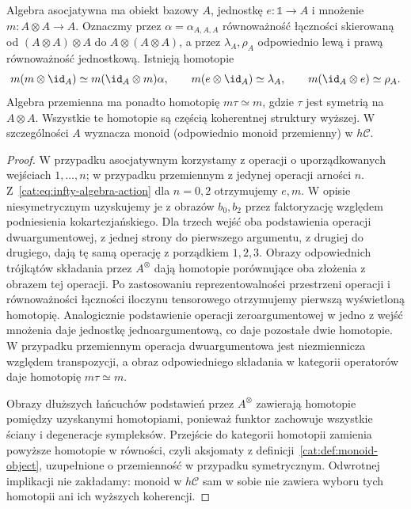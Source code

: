 \begin{stwierdzenie}\label{cat:prop:infty-algebra-multiplication}
Algebra asocjatywna ma obiekt bazowy $A$, jednostkę $e:\mathbb 1\to A$ i mnożenie $m:A\otimes A\to A$. Oznaczmy przez $\alpha=\alpha_{A,A,A}$ równoważność łączności skierowaną od $(A\otimes A)\otimes A$ do $A\otimes(A\otimes A)$, a przez $\lambda_A,\rho_A$ odpowiednio lewą i prawą równoważność jednostkową. Istnieją homotopie
\[
 m(m\otimes\id_A)\simeq m(\id_A\otimes m)\alpha,\qquad
 m(e\otimes\id_A)\simeq\lambda_A,\qquad
 m(\id_A\otimes e)\simeq\rho_A.
\]
Algebra przemienna ma ponadto homotopię $m\tau\simeq m$, gdzie $\tau$ jest symetrią na $A\otimes A$. Wszystkie te homotopie są częścią koherentnej struktury wyższej. W szczególności $A$ wyznacza monoid (odpowiednio monoid przemienny) w $h\mathcal C$.
\end{stwierdzenie}
\begin{proof}
W przypadku asocjatywnym korzystamy z operacji o uporządkowanych wejściach $1,\ldots,n$; w przypadku przemiennym z jedynej operacji arności $n$. Z~\eqref{cat:eq:infty-algebra-action} dla $n=0,2$ otrzymujemy $e,m$. W opisie niesymetrycznym uzyskujemy je z obrazów $b_0,b_2$ przez faktoryzację względem podniesienia kokartezjańskiego. Dla trzech wejść oba podstawienia operacji dwuargumentowej, z jednej strony do pierwszego argumentu, z drugiej do drugiego, dają tę samą operację z porządkiem $1,2,3$. Obrazy odpowiednich trójkątów składania przez $A^\otimes$ dają homotopie porównujące oba złożenia z obrazem tej operacji. Po zastosowaniu reprezentowalności przestrzeni operacji i równoważności łączności iloczynu tensorowego otrzymujemy pierwszą wyświetloną homotopię. Analogicznie podstawienie operacji zeroargumentowej w jedno z wejść mnożenia daje jednostkę jednoargumentową, co daje pozostałe dwie homotopie. W przypadku przemiennym operacja dwuargumentowa jest niezmiennicza względem transpozycji, a obraz odpowiedniego składania w kategorii operatorów daje homotopię $m\tau\simeq m$.

Obrazy dłuższych łańcuchów podstawień przez $A^\otimes$ zawierają homotopie pomiędzy uzyskanymi homotopiami, ponieważ funktor zachowuje wszystkie ściany i degeneracje sympleksów. Przejście do kategorii homotopii zamienia powyższe homotopie w równości, czyli aksjomaty z definicji~\ref{cat:def:monoid-object}, uzupełnione o przemienność w przypadku symetrycznym. Odwrotnej implikacji nie zakładamy: monoid w $h\mathcal C$ sam w sobie nie zawiera wyboru tych homotopii ani ich wyższych koherencji.
\end{proof}

